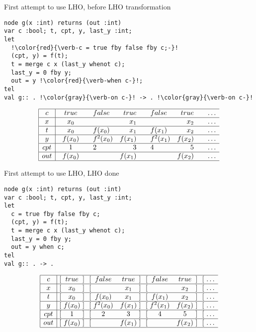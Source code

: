 \documentclass[xcolor=dvipsnames]{beamer}
\def\li{\\ \hline}
\begin{document}
\begin{frame}[fragile]{First attempt to use LHO, before LHO transformation}
\begin{lstlisting}[escapechar=!]
node g(x :int) returns (out :int)
var c :bool; t, cpt, y, last_y :int;
let
  !\color{red}{\verb-c = true fby false fby c;-}!
  (cpt, y) = f(t);
  t = merge c x (last_y whenot c);
  last_y = 0 fby y;
  out = y !\color{red}{\verb-when c-}!;
tel
val g:: . !\color{gray}{\verb-on c-}! -> . !\color{gray}{\verb-on c-}!
\end{lstlisting}
\[
\begin{array}{|c|@{\ \ \ }c@{\ \ \ }@{\ \ \ }lr@{\ \ \ }@{\ \ \ }lr@{\ \ \ }@{\ \ \ }lr} \hline
c & true & false & true & false & true & \ldots\li
x & x_0 & & x_1 & & x_2 &\ldots\li
t & x_0 & f(x_0) & x_1 & f(x_1) & x_2 &\ldots\li 
y & f(x_0) & f^2(x_0) & f(x_1) & f^2(x_1) & f(x_2) &\ldots\li
cpt & 1 & 2 & 3 & 4 & 5 &\ldots\li
out & f(x_0) & & f(x_1) & & f(x_2) &\ldots \li
\end{array}
\]
\end{frame}
\begin{frame}[fragile]{First attempt to use LHO, LHO done}
\begin{lstlisting}[escapechar=!]
node g(x :int) returns (out :int)
var c :bool; t, cpt, y, last_y :int;
let
  c = true fby false fby c;
  (cpt, y) = f(t);
  t = merge c x (last_y whenot c);
  last_y = 0 fby y;
  out = y when c;
tel
val g:: . -> .
\end{lstlisting}
\[
\begin{array}{|c|@{\ [\ }c@{\ ]\ }@{\ [\ }cc@{\ ]\ }@{\ [\ }cc@{\ ]\ }@{\ [\ }lr} \hline
c & true & false & true & false & true & \ldots\li
x & x_0 & & x_1 & & x_2 &\ldots\li
t & x_0 & f(x_0) & x_1 & f(x_1) & x_2 &\ldots\li 
y & f(x_0) & f^2(x_0) & f(x_1) & f^2(x_1) & f(x_2) &\ldots\li
cpt & 1 & 2 & 3 & 4 & 5 &\ldots\li
out & f(x_0) & & f(x_1) & & f(x_2) &\ldots \li
\end{array}
\]
\end{frame}
\end{document}
